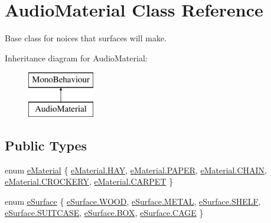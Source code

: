 \hypertarget{class_audio_material}{}\section{Audio\+Material Class Reference}
\label{class_audio_material}


Base class for noice\textquotesingle{}s that surfaces will make.  


Inheritance diagram for Audio\+Material\+:\begin{figure}[H]
\begin{center}
\leavevmode
\includegraphics[height=2.000000cm]{class_audio_material}
\end{center}
\end{figure}
\subsection*{Public Types}
\begin{DoxyCompactItemize}
\item 
enum \mbox{\hyperlink{class_audio_material_a151b037a36c4d5e527fde55fce102fbf}{e\+Material}} \{ \newline
\mbox{\hyperlink{class_audio_material_a151b037a36c4d5e527fde55fce102fbfaac4d40a89cccad18a10721e8c1a89935}{e\+Material.\+H\+AY}}, 
\mbox{\hyperlink{class_audio_material_a151b037a36c4d5e527fde55fce102fbfa0569c6636064a1abe85a8910b7446f6c}{e\+Material.\+P\+A\+P\+ER}}, 
\mbox{\hyperlink{class_audio_material_a151b037a36c4d5e527fde55fce102fbfa014d2cf3cdc3af6f4f92c09190860e33}{e\+Material.\+C\+H\+A\+IN}}, 
\mbox{\hyperlink{class_audio_material_a151b037a36c4d5e527fde55fce102fbfa97f8f868275a6fd35b1ea839b03c0040}{e\+Material.\+C\+R\+O\+C\+K\+E\+RY}}, 
\newline
\mbox{\hyperlink{class_audio_material_a151b037a36c4d5e527fde55fce102fbfa17fa84d23d53dfe15dcc529d6f749f50}{e\+Material.\+C\+A\+R\+P\+ET}}
 \}
\item 
enum \mbox{\hyperlink{class_audio_material_a0eaec8dca6445f5aa32e1146666cfe49}{e\+Surface}} \{ \newline
\mbox{\hyperlink{class_audio_material_a0eaec8dca6445f5aa32e1146666cfe49a8029fbd172f8364c78bd96ba415014d5}{e\+Surface.\+W\+O\+OD}}, 
\mbox{\hyperlink{class_audio_material_a0eaec8dca6445f5aa32e1146666cfe49a74108a89672c573afee1fae6de8e4e0b}{e\+Surface.\+M\+E\+T\+AL}}, 
\mbox{\hyperlink{class_audio_material_a0eaec8dca6445f5aa32e1146666cfe49a25f1b4b9f076bc6239ae45dc067aa58e}{e\+Surface.\+S\+H\+E\+LF}}, 
\mbox{\hyperlink{class_audio_material_a0eaec8dca6445f5aa32e1146666cfe49a97427a7b1cd77df1fd59b43c98f93653}{e\+Surface.\+S\+U\+I\+T\+C\+A\+SE}}, 
\newline
\mbox{\hyperlink{class_audio_material_a0eaec8dca6445f5aa32e1146666cfe49ae657cce1913c857166b0475f18668ef5}{e\+Surface.\+B\+OX}}, 
\mbox{\hyperlink{class_audio_material_a0eaec8dca6445f5aa32e1146666cfe49abdd7cb22655157b4550490c219a43888}{e\+Surface.\+C\+A\+GE}}
 \}
\end{DoxyCompactItemize}
